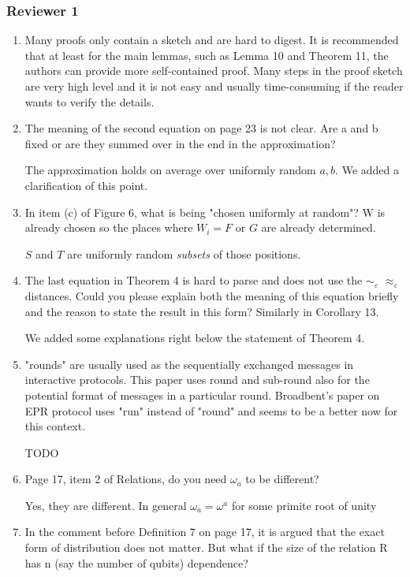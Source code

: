 \documentclass[12pt]{article}
\newcommand{\eps}{\varepsilon}
\begin{document}
\subsubsection*{Reviewer 1}
\begin{enumerate}
\item Many proofs only contain a sketch and are hard to digest. It is recommended that at least for the main lemmas, such as Lemma 10 and Theorem 11, the authors can provide more self-contained proof. Many steps in the proof sketch are very high level and it is not easy and usually time-consuming if the reader wants to verify the details.
\item The meaning of the second equation on page 23 is not clear. Are a and b fixed or are they summed over in the end in the approximation?

				{\color{blue}The approximation holds on average over uniformly random $a,b$. We added a clarification of this point.}
				
\item In item (c) of Figure 6, what is being "chosen uniformly at random"? W is already chosen so the places where $W_i = F$ or $G$ are already determined.

{\color{blue} $S$ and $T$ are uniformly random \emph{subsets} of those positions.}

\item The last equation in Theorem 4 is hard to parse and does not use the $\sim_\eps$ $\approx_\eps$ distances. Could you please explain both the meaning of this equation briefly and the reason to state the result in this form? Similarly in Corollary 13.

{\color{blue} We added some explanations right below the statement of Theorem 4.}

\item "rounds" are usually used as the sequentially exchanged messages in interactive protocols. This paper uses round and sub-round also for the potential format of messages in a particular round. Broadbent's paper on EPR protocol uses "run" instead of "round" and seems to be a better now for this context.

{\color{red} TODO}

\item Page 17, item 2 of Relations, do you need $\omega_a$ to be different?

{\color{blue} Yes, they are different. In general $\omega_a = \omega^a$ for some primite root of unity}

\item In the comment before Definition 7 on page 17, it is argued that the exact form of distribution does not matter. But what if the size of the relation R has n (say the number of qubits) dependence?


\end{enumerate}
\end{document}

